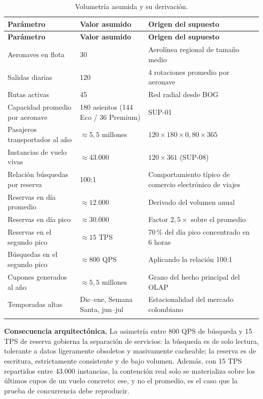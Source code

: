 \documentclass[10pt,letterpaper]{article}
\newcommand{\nota}[1]{%
  \begin{tcolorbox}[colback=cajaFondo,colframe=usaAzul!60,sharp corners=south]#1\end{tcolorbox}}
\begin{document}
\begin{longtable}{@{}L{6.4cm} L{3.4cm} L{5.6cm}@{}}
\toprule
\textbf{Parámetro} & \textbf{Valor asumido} & \textbf{Origen del supuesto} \\
\midrule
\endfirsthead
\toprule
\textbf{Parámetro} & \textbf{Valor asumido} & \textbf{Origen del supuesto} \\
\midrule
\endhead
Aeronaves en flota & 30 & Aerolínea regional de tamaño medio \\
Salidas diarias & 120 & 4 rotaciones promedio por aeronave \\
Rutas activas & 45 & Red radial desde BOG \\
Capacidad promedio por aeronave & 180 asientos (144 Eco / 36 Premium) & SUP-01 \\
Pasajeros transportados al año & $\approx 5{,}5$ millones & $120 \times 180 \times 0{,}80 \times 365$ \\
Instancias de vuelo vivas & $\approx 43{.}000$ & $120 \times 361$ (SUP-08) \\
Relación búsquedas por reserva & 100:1 & Comportamiento típico de comercio electrónico de viajes \\
Reservas en día promedio & $\approx 12{.}000$ & Derivado del volumen anual \\
Reservas en día pico & $\approx 30{.}000$ & Factor $2{,}5\times$ sobre el promedio \\
Reservas en el segundo pico & $\approx 15$ TPS & 70\,\% del día pico concentrado en 6 horas \\
Búsquedas en el segundo pico & $\approx 800$ QPS & Aplicando la relación 100:1 \\
Cupones generados al año & $\approx 5{,}5$ millones & Grano del hecho principal del OLAP \\
Temporadas altas & Dic--ene, Semana Santa, jun--jul & Estacionalidad del mercado colombiano \\
\bottomrule
\caption{Volumetría asumida y su derivación.}
\end{longtable}

\nota{\textbf{Consecuencia arquitectónica.} La asimetría entre 800 QPS de búsqueda y 15 TPS de reserva gobierna la separación de servicios: la búsqueda es de solo lectura, tolerante a datos ligeramente obsoletos y masivamente cacheable; la reserva es de escritura, estrictamente consistente y de bajo volumen. Además, con 15 TPS repartidos entre 43.000 instancias, la contención real solo se materializa sobre los últimos cupos de un vuelo concreto: ese, y no el promedio, es el caso que la prueba de concurrencia debe reproducir.}
\end{document}
